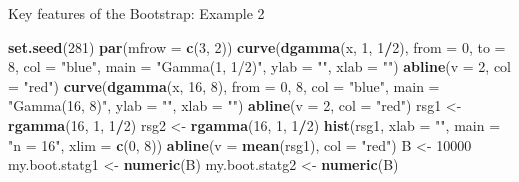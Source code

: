 \documentclass[
  ignorenonframetext,
]{beamer}
\newenvironment{Shaded}{\begin{snugshade}}{\end{snugshade}}
\newcommand{\AttributeTok}[1]{\textcolor[rgb]{0.13,0.29,0.53}{#1}}
\newcommand{\DecValTok}[1]{\textcolor[rgb]{0.00,0.00,0.81}{#1}}
\newcommand{\FunctionTok}[1]{\textcolor[rgb]{0.13,0.29,0.53}{\textbf{#1}}}
\newcommand{\NormalTok}[1]{#1}
\newcommand{\OtherTok}[1]{\textcolor[rgb]{0.56,0.35,0.01}{#1}}
\newcommand{\SpecialCharTok}[1]{\textcolor[rgb]{0.81,0.36,0.00}{\textbf{#1}}}
\newcommand{\StringTok}[1]{\textcolor[rgb]{0.31,0.60,0.02}{#1}}
\begin{document}
\begin{frame}[fragile]{Key features of the Bootstrap: Example 2}
\protect\hypertarget{key-features-of-the-bootstrap-example-2-1}{}
\tiny

\begin{Shaded}
\begin{Highlighting}[]
\FunctionTok{set.seed}\NormalTok{(}\DecValTok{281}\NormalTok{)}
\FunctionTok{par}\NormalTok{(}\AttributeTok{mfrow =} \FunctionTok{c}\NormalTok{(}\DecValTok{3}\NormalTok{, }\DecValTok{2}\NormalTok{))}
\FunctionTok{curve}\NormalTok{(}\FunctionTok{dgamma}\NormalTok{(x, }\DecValTok{1}\NormalTok{, }\DecValTok{1}\SpecialCharTok{/}\DecValTok{2}\NormalTok{), }\AttributeTok{from =} \DecValTok{0}\NormalTok{, }\AttributeTok{to =} \DecValTok{8}\NormalTok{, }\AttributeTok{col =} \StringTok{"blue"}\NormalTok{, }\AttributeTok{main =} \StringTok{"Gamma(1, 1/2)"}\NormalTok{, }\AttributeTok{ylab =} \StringTok{""}\NormalTok{, }\AttributeTok{xlab =} \StringTok{""}\NormalTok{)}
\FunctionTok{abline}\NormalTok{(}\AttributeTok{v =} \DecValTok{2}\NormalTok{, }\AttributeTok{col =} \StringTok{"red"}\NormalTok{)}
\FunctionTok{curve}\NormalTok{(}\FunctionTok{dgamma}\NormalTok{(x, }\DecValTok{16}\NormalTok{, }\DecValTok{8}\NormalTok{), }\AttributeTok{from =} \DecValTok{0}\NormalTok{, }\DecValTok{8}\NormalTok{, }\AttributeTok{col =} \StringTok{"blue"}\NormalTok{, }\AttributeTok{main =} \StringTok{"Gamma(16, 8)"}\NormalTok{, }\AttributeTok{ylab =} \StringTok{""}\NormalTok{, }\AttributeTok{xlab =} \StringTok{""}\NormalTok{)}
\FunctionTok{abline}\NormalTok{(}\AttributeTok{v =} \DecValTok{2}\NormalTok{, }\AttributeTok{col =} \StringTok{"red"}\NormalTok{)}
\NormalTok{rsg1 }\OtherTok{\textless{}{-}} \FunctionTok{rgamma}\NormalTok{(}\DecValTok{16}\NormalTok{, }\DecValTok{1}\NormalTok{, }\DecValTok{1}\SpecialCharTok{/}\DecValTok{2}\NormalTok{)}
\NormalTok{rsg2 }\OtherTok{\textless{}{-}} \FunctionTok{rgamma}\NormalTok{(}\DecValTok{16}\NormalTok{, }\DecValTok{1}\NormalTok{, }\DecValTok{1}\SpecialCharTok{/}\DecValTok{2}\NormalTok{)}
\FunctionTok{hist}\NormalTok{(rsg1, }\AttributeTok{xlab =} \StringTok{""}\NormalTok{, }\AttributeTok{main =} \StringTok{"n = 16"}\NormalTok{, }\AttributeTok{xlim =} \FunctionTok{c}\NormalTok{(}\DecValTok{0}\NormalTok{, }\DecValTok{8}\NormalTok{))}
\FunctionTok{abline}\NormalTok{(}\AttributeTok{v =} \FunctionTok{mean}\NormalTok{(rsg1), }\AttributeTok{col =} \StringTok{"red"}\NormalTok{)}
\NormalTok{B }\OtherTok{\textless{}{-}} \DecValTok{10000}
\NormalTok{my.boot.statg1 }\OtherTok{\textless{}{-}} \FunctionTok{numeric}\NormalTok{(B)}
\NormalTok{my.boot.statg2 }\OtherTok{\textless{}{-}} \FunctionTok{numeric}\NormalTok{(B)}

\end{Highlighting}
\end{Shaded}
\end{frame}
\end{document}
